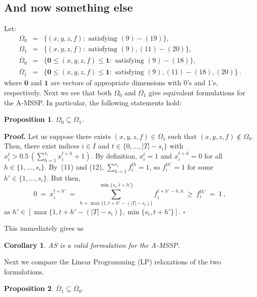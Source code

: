 \documentclass[
  11pt,
  twoside,
  11pt]{article}
\newtheorem{Corollary}{Corollary}
\newtheorem{Proposition}{Proposition}
\numberwithin{Theorem}{section}
\numberwithin{Definition}{section}
\numberwithin{Lemma}{section}
\numberwithin{Algorithm}{section}
\numberwithin{equation}{section}
\begin{document}
\subsection{And now something else}

\noindent
Let:
\begin{eqnarray*}
\Omega_0 & = & \{(x,y,z,f): \text{ satisfying } (9)-(19)\}, \\
\Omega_1 & = & \{(x,y,z,f): \text{ satisfying } (9),(11)-(20)\}, \\
\overline{\Omega}_0 & = & \{\textbf{0}\leq (x,y,z,f) \leq \textbf{1}: \text{ satisfying } (9)-(18)\}, \\
\overline{\Omega}_1 & = & \{\textbf{0}\leq (x,y,z,f) \leq \textbf{1}: \text{ satisfying } (9),(11)-(18),(20)\} \,.
\end{eqnarray*}
%
where $\textbf{0}$ and $\textbf{1}$ are vectors of appropriate dimensions with 0's and 1's, respectively.
Next we see that both $\Omega_0$ and $\Omega_1$ give equivalent formulations for the A-MSSP. In particular, the following statements hold:

\begin{Proposition}
$\Omega_0 \subseteq \Omega_1$.
\end{Proposition}

\noindent
\textbf{Proof.}
Let us suppose there exists $(x,y,z,f) \in \Omega_1$ such that $(x,y,z,f) \notin \Omega_0$.
Then, there exist indices $i \in I$ and $t \in \{0,\ldots,|T|-s_i\} $ with $x_i^t > \displaystyle 0.5\,\left( \sum_{h=1}^{s_i} x_i^{t+h} +1\right)$.
By definition, $x_i^t = 1$ and $x_i^{t+h} = 0$ for all $h \in \{1,\dots,s_i\}$. By~(11) and (12), $\displaystyle \sum_{h=1}^{s_i} f_i^{th}=1$, so $f_i^{th'}=1$ for some $h' \in \{1,\dots,s_i\}$.
But then,
\[ 0 \:=\: x_i^{t+h'} \:=\: \sum_{h=\max \{1, t+h'-(|T|-s_i)\}}^{\min\{s_i,t+h'\}} f_i^{t+h'-h,h} \:\ge\: f_i^{th'} \:=\: 1 \,,
\]
as $h' \in [\max \{1, t+h'-(|T|-s_i)\}, \min\{s_i,t+h'\}]$.
\hfill $\square$
\bigskip

\noindent
This immediately gives us
\begin{Corollary}
AS is a valid formulation for the A-MSSP.
\end{Corollary}

\noindent
Next we compare the Linear Programming (LP) relaxations of the two formulations.

\begin{Proposition}
$\overline{\Omega}_1 \subseteq  \overline{\Omega}_0 $.
\end{Proposition}
\end{document}
